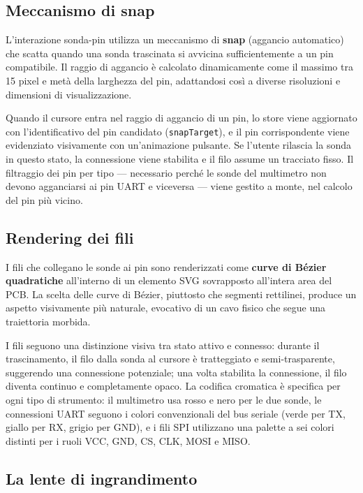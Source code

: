 \subsection{Meccanismo di snap}

L'interazione sonda-pin utilizza un meccanismo di \textbf{snap} (aggancio automatico) che scatta quando una sonda trascinata si avvicina sufficientemente a un pin compatibile. Il raggio di aggancio è calcolato dinamicamente come il massimo tra 15 pixel e metà della larghezza del pin, adattandosi così a diverse risoluzioni e dimensioni di visualizzazione.

Quando il cursore entra nel raggio di aggancio di un pin, lo store viene aggiornato con l'identificativo del pin candidato (\texttt{snapTarget}), e il pin corrispondente viene evidenziato visivamente con un'animazione pulsante. Se l'utente rilascia la sonda in questo stato, la connessione viene stabilita e il filo assume un tracciato fisso. Il filtraggio dei pin per tipo --- necessario perché le sonde del multimetro non devono agganciarsi ai pin UART e viceversa --- viene gestito a monte, nel calcolo del pin più vicino.

\subsection{Rendering dei fili}

I fili che collegano le sonde ai pin sono renderizzati come \textbf{curve di Bézier quadratiche} all'interno di un elemento SVG sovrapposto all'intera area del PCB. La scelta delle curve di Bézier, piuttosto che segmenti rettilinei, produce un aspetto visivamente più naturale, evocativo di un cavo fisico che segue una traiettoria morbida.

I fili seguono una distinzione visiva tra stato attivo e connesso: durante il trascinamento, il filo dalla sonda al cursore è tratteggiato e semi-trasparente, suggerendo una connessione potenziale; una volta stabilita la connessione, il filo diventa continuo e completamente opaco. La codifica cromatica è specifica per ogni tipo di strumento: il multimetro usa rosso e nero per le due sonde, le connessioni UART seguono i colori convenzionali del bus seriale (verde per TX, giallo per RX, grigio per GND), e i fili SPI utilizzano una palette a sei colori distinti per i ruoli VCC, GND, CS, CLK, MOSI e MISO.

\subsection{La lente di ingrandimento}

